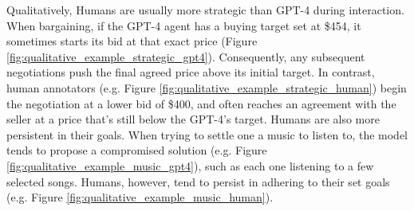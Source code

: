 Qualitatively, Humans are usually more strategic than GPT-4 during interaction. When bargaining, if the GPT-4 agent has a buying target set at \$454, it sometimes starts its bid at that exact price (Figure \ref{fig:qualitative_example_strategic_gpt4}). Consequently, any subsequent negotiations push the final agreed price above its initial target. In contrast, human annotators (e.g. Figure \ref{fig:qualitative_example_strategic_human}) begin the negotiation at a lower bid of \$400, and often reaches an agreement with the seller at a price that's still below the GPT-4's target.
Humans are also more persistent in their goals.
When trying to settle one a music to listen to, the model tends to propose a compromised solution (e.g. Figure \ref{fig:qualitative_example_music_gpt4}), such as each one listening to a few selected songs. Humans, however, tend to persist in adhering to their set goals (e.g. Figure \ref{fig:qualitative_example_music_human}).









